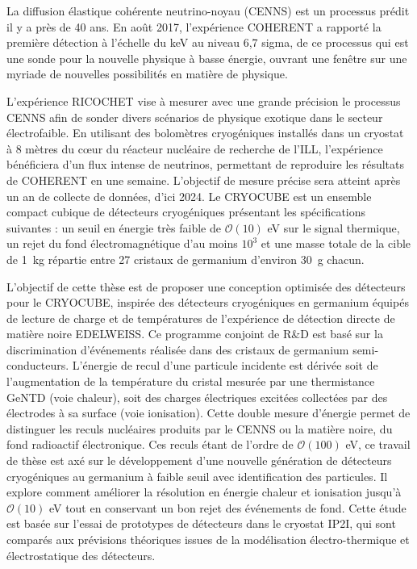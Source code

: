 \documentclass[
11pt, %
english, %
singlespacing, %
headsepline, %
]{MastersDoctoralThesis} %
\begin{document}
\begin{abstractfr}
\addchaptertocentry{\abstractnamefr} %

{\small

La diffusion élastique cohérente neutrino-noyau (CENNS) est un processus prédit il y a près de 40 ans. En août 2017, l'expérience COHERENT a rapporté la première détection à l’échelle du \si{\kilo\eV} au niveau 6,7 sigma, de ce processus qui est une sonde pour la nouvelle physique à basse énergie, ouvrant une fenêtre sur une myriade de nouvelles possibilités en matière de physique.

L'expérience RICOCHET vise à mesurer avec une grande précision le processus CENNS afin de sonder divers scénarios de physique exotique dans le secteur électrofaible. En utilisant des bolomètres cryogéniques installés dans un cryostat à 8 mètres du cœur du réacteur nucléaire de recherche de l'ILL, l’expérience bénéficiera d'un flux intense de neutrinos, permettant de reproduire les résultats de COHERENT en une semaine. L'objectif de mesure précise sera atteint après un an de collecte de données, d’ici 2024.
Le CRYOCUBE est un ensemble compact cubique de détecteurs cryogéniques présentant les spécifications suivantes : un seuil en énergie très faible de $\mathcal{O}(10)$ eV sur le signal thermique, un rejet du fond électromagnétique d'au moins $10^3$ et une masse totale de la cible de \SI{1}{\kg} répartie entre 27 cristaux de germanium d'environ \SI{30}{\g} chacun.

L'objectif de cette thèse est de proposer une conception optimisée des détecteurs pour le CRYOCUBE, inspirée des détecteurs cryogéniques en germanium équipés de lecture de charge et de températures de l'expérience de détection directe de matière noire EDELWEISS. Ce programme conjoint de R\&D est basé sur la discrimination d'événements réalisée dans des cristaux de germanium semi-conducteurs. L'énergie de recul d'une particule incidente est dérivée soit de l'augmentation de la température du cristal mesurée par une thermistance GeNTD (voie chaleur), soit des charges électriques excitées collectées par des électrodes à sa surface (voie ionisation). Cette double mesure d'énergie permet de distinguer les reculs nucléaires produits par le CENNS ou la matière noire, du fond radioactif électronique. Ces reculs étant de l’ordre de $\mathcal{O}(100)$ \si{eV}, ce travail de thèse est axé sur le développement d'une nouvelle génération de détecteurs cryogéniques au germanium à faible seuil avec identification des particules. Il explore comment améliorer la résolution en énergie chaleur et ionisation jusqu'à $\mathcal{O}(10)$ \si{eV} tout en conservant un bon rejet des événements de fond. Cette étude est basée sur l'essai de prototypes de détecteurs dans le cryostat IP2I, qui sont comparés aux prévisions théoriques issues de la modélisation électro-thermique et électrostatique des détecteurs.

}
\end{abstractfr}
\end{document}
